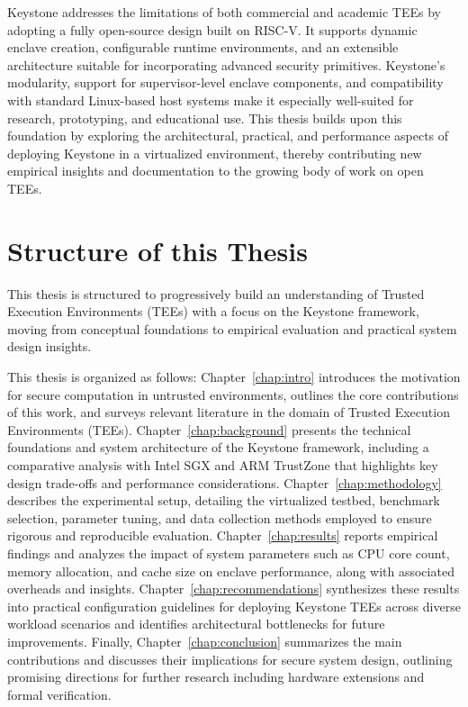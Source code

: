 Keystone addresses the limitations of both commercial and academic TEEs by adopting a fully open-source design built on RISC-V. It supports dynamic enclave creation, configurable runtime environments, and an extensible architecture suitable for incorporating advanced security primitives. Keystone’s modularity, support for supervisor-level enclave components, and compatibility with standard Linux-based host systems make it especially well-suited for research, prototyping, and educational use. This thesis builds upon this foundation by exploring the architectural, practical, and performance aspects of deploying Keystone in a virtualized environment, thereby contributing new empirical insights and documentation to the growing body of work on open TEEs.

\section{Structure of this Thesis}

This thesis is structured to progressively build an understanding of Trusted Execution Environments (TEEs) with a focus on the Keystone framework, moving from conceptual foundations to empirical evaluation and practical system design insights.

This thesis is organized as follows: Chapter~\ref{chap:intro} introduces the motivation for secure computation in untrusted environments, outlines the core contributions of this work, and surveys relevant literature in the domain of Trusted Execution Environments (TEEs). Chapter~\ref{chap:background} presents the technical foundations and system architecture of the Keystone framework, including a comparative analysis with Intel SGX and ARM TrustZone that highlights key design trade-offs and performance considerations. Chapter~\ref{chap:methodology} describes the experimental setup, detailing the virtualized testbed, benchmark selection, parameter tuning, and data collection methods employed to ensure rigorous and reproducible evaluation. Chapter~\ref{chap:results} reports empirical findings and analyzes the impact of system parameters such as CPU core count, memory allocation, and cache size on enclave performance, along with associated overheads and insights. Chapter~\ref{chap:recommendations} synthesizes these results into practical configuration guidelines for deploying Keystone TEEs across diverse workload scenarios and identifies architectural bottlenecks for future improvements. Finally, Chapter~\ref{chap:conclusion} summarizes the main contributions and discusses their implications for secure system design, outlining promising directions for further research including hardware extensions and formal verification.